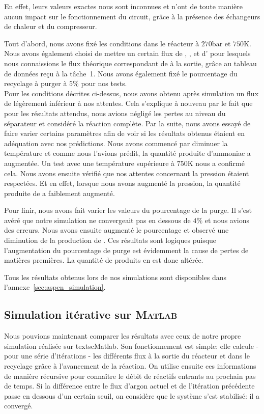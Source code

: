 \documentclass[a4paper, oneside, 12pt]{article}
\begin{document}
En effet, leurs valeurs exactes nous sont inconnues et n'ont de toute manière 
aucun impact sur le fonctionnement du circuit, grâce à la présence des échangeurs de chaleur 
et du compresseur.

Tout d'abord, nous avons fixé les conditions dans le réacteur à $270\si{\bar}$ 
et $750\si{\kelvin}$. 
Nous avons également choisi de mettre un certain flux de , , et d'  
pour lesquels nous connaissions le flux théorique correspondant de  à la sortie,
grâce au tableau de données reçu à la tâche~1. 
Nous avons également fixé le pourcentage du recyclage à purger à $5\%$ pour nos tests.\\

Pour les conditions décrites ci-dessus, 
nous avons obtenu après simulation un flux de  légèrement inférieur à nos attentes. 
Cela s'explique à nouveau par le fait que pour les résultats attendus, 
nous avions négligé les pertes au niveau du séparateur et considéré la réaction complète.
Par la suite, nous avons essayé de faire varier certains paramètres afin 
de voir si les résultats obtenus étaient en adéquation avec nos prédictions. 
Nous avons commencé par diminuer la température et comme nous l'avions prédit, 
la quantité produite d'ammoniac a augmentée. 
Un test avec une température supérieure à $750\si{\kelvin}$ nous a confirmé cela. 
Nous avons ensuite vérifié que nos attentes concernant la pression étaient respectées. 
Et en effet, lorsque nous avons augmenté la pression, 
la quantité produite de  a faiblement augmenté.

Pour finir, nous avons fait varier les valeurs du pourcentage de la purge.
Il s'est avéré que notre simulation ne convergeait pas en dessous de $4\%$ 
et nous avions des erreurs.
Nous avons ensuite augmenté le pourcentage 
et observé une diminution de la production de . 
Ces résultats sont logiques puisque l'augmentation du pourcentage 
de purge est évidemment la cause de pertes de matières premières. 
La quantité de produits en est donc altérée.

Tous les résultats obtenus lors de nos simulations 
sont disponibles dans l'annexe~\ref{sec:aspen_simulation}.

\subsection{Simulation itérative sur \textsc{Matlab}}

Nous pouvions maintenant comparer les résultats
avec ceux de notre propre simulation réalisée sur
textsc{Matlab}. Son fonctionnement est simple:
elle calcule - pour une série d'itérations - 
les différents flux à la sortie du réacteur 
et dans le recyclage grâce à l'avancement de
la réaction. On utilise ensuite ces informations 
de manière récursive pour connaître le débit de 
réactifs entrants au prochain pas de temps. Si 
la différence entre le flux d'argon actuel et 
de l'itération précédente passe en dessous d'un 
certain seuil, on considère que le système s'est 
stabilisé: il a convergé.
\end{document}
